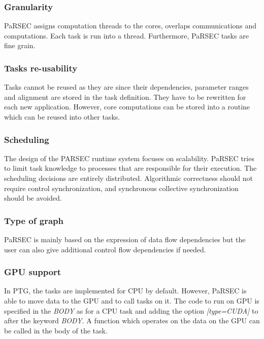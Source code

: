 \begin{figure}

\end{figure}


\subsubsection{Granularity}
PaRSEC assigns computation threads to the cores, overlaps communications and computations.
Each task is run into a thread.
Furthermore, PaRSEC tasks are fine grain.

\subsubsection{Tasks re-usability}
Tasks cannot be reused as they are since their dependencies, parameter ranges and alignment are stored in the task definition.
They have to be rewritten for each new application.
However, core computations can be stored into a routine which can be reused into other tasks.

\subsubsection{Scheduling}
The design of the PARSEC runtime system focuses on scalability.
PaRSEC tries to limit task knowledge to processes that are responsible for their execution.
The scheduling decisions are entirely distributed.
Algorithmic correctness should not require control synchronization, and synchronous collective synchronization should be avoided.


\subsubsection{Type of graph}
PaRSEC is mainly based on the expression of data flow dependencies but the user can also give additional control flow dependencies if needed.

\subsubsection{GPU support}
In PTG, the tasks are implemented for CPU by default.
However, PaRSEC is able to move data to the GPU and to call tasks on it.
The code to run on GPU is specified in the \textit{BODY} as for a CPU task and adding the option \textit{[type=CUDA]} to
after the keyword \textit{BODY}.
A function which operates on the data on the GPU can be called in the body of the task.


